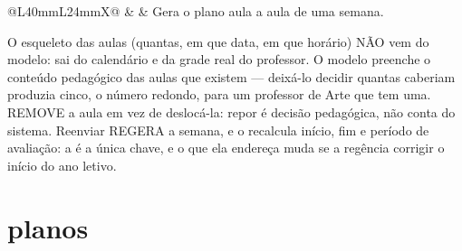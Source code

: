 \begin{tabularx}{\linewidth}{@{}L{40mm}L{24mm}X@{}}
 &  & Gera o plano aula a aula de uma semana.\par O esqueleto das aulas (quantas, em que data, em que horário) NÃO vem do modelo: sai do calendário e da grade real do professor. O modelo preenche o conteúdo pedagógico das aulas que existem --- deixá-lo decidir quantas caberiam produzia cinco, o número redondo, para um professor de Arte que tem uma.  REMOVE a aula em vez de deslocá-la: repor é decisão pedagógica, não conta do sistema. Reenviar REGERA a semana, e o  recalcula início, fim e período de avaliação: a  é a única chave, e o que ela endereça muda se a regência corrigir o início do ano letivo.\\
\bottomrule
\end{tabularx}

\section{planos}

